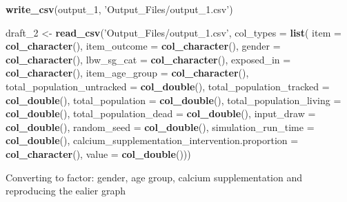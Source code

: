 \documentclass[]{article}
\newenvironment{Shaded}{\begin{snugshade}}{\end{snugshade}}
\newcommand{\DataTypeTok}[1]{\textcolor[rgb]{0.13,0.29,0.53}{#1}}
\newcommand{\DecValTok}[1]{\textcolor[rgb]{0.00,0.00,0.81}{#1}}
\newcommand{\KeywordTok}[1]{\textcolor[rgb]{0.13,0.29,0.53}{\textbf{#1}}}
\newcommand{\NormalTok}[1]{#1}
\newcommand{\OperatorTok}[1]{\textcolor[rgb]{0.81,0.36,0.00}{\textbf{#1}}}
\newcommand{\StringTok}[1]{\textcolor[rgb]{0.31,0.60,0.02}{#1}}
\begin{document}
\begin{Shaded}
\begin{Highlighting}[]
\KeywordTok{write_csv}\NormalTok{(output_}\DecValTok{1}\NormalTok{, }\StringTok{'Output_Files/output_1.csv'}\NormalTok{)}
\end{Highlighting}
\end{Shaded}

\begin{Shaded}
\begin{Highlighting}[]
\NormalTok{draft_}\DecValTok{2}\NormalTok{ <-}\StringTok{ }\KeywordTok{read_csv}\NormalTok{(}\StringTok{'Output_Files/output_1.csv'}\NormalTok{,}
               \DataTypeTok{col_types =} \KeywordTok{list}\NormalTok{(}
                 \DataTypeTok{item =} \KeywordTok{col_character}\NormalTok{(),}
                 \DataTypeTok{item_outcome =} \KeywordTok{col_character}\NormalTok{(),}
                 \DataTypeTok{gender =} \KeywordTok{col_character}\NormalTok{(),}
                 \DataTypeTok{lbw_sg_cat =} \KeywordTok{col_character}\NormalTok{(),}
                 \DataTypeTok{exposed_in =} \KeywordTok{col_character}\NormalTok{(),}
                 \DataTypeTok{item_age_group =} \KeywordTok{col_character}\NormalTok{(),}
                 \DataTypeTok{total_population_untracked =} \KeywordTok{col_double}\NormalTok{(),}
                 \DataTypeTok{total_population_tracked =} \KeywordTok{col_double}\NormalTok{(),}
                 \DataTypeTok{total_population =} \KeywordTok{col_double}\NormalTok{(),}
                 \DataTypeTok{total_population_living =} \KeywordTok{col_double}\NormalTok{(),}
                 \DataTypeTok{total_population_dead =} \KeywordTok{col_double}\NormalTok{(),}
                 \DataTypeTok{input_draw =} \KeywordTok{col_double}\NormalTok{(),}
                 \DataTypeTok{random_seed =} \KeywordTok{col_double}\NormalTok{(),}
                 \DataTypeTok{simulation_run_time =} \KeywordTok{col_double}\NormalTok{(),}
                 \DataTypeTok{calcium_supplementation_intervention.proportion =} \KeywordTok{col_character}\NormalTok{(),}
                 \DataTypeTok{value =} \KeywordTok{col_double}\NormalTok{()))}
\end{Highlighting}
\end{Shaded}

Converting to factor: gender, age group, calcium supplementation and
reproducing the ealier graph

\begin{Shaded}
\end{Shaded}
\end{document}
